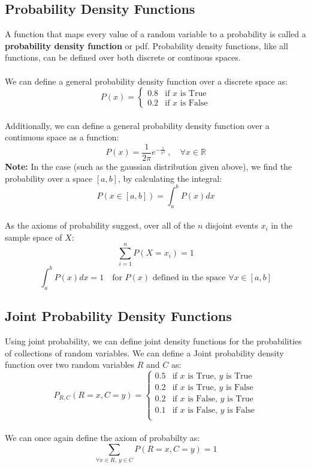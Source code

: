 \documentclass[12pt, a4paper]{book}
\begin{document}
\subsection{Probability Density Functions}
A function that maps every value of a random variable to a probability is called a \textbf{probability density function} or pdf. Probability density functions, like all functions, can be defined over both discrete or continous spaces.\\\\
We can define a general probability density function over a discrete space as:
$$P(x) = \begin{cases}
    0.8 & \text{if $x$ is True}\\
    0.2 & \text{if $x$ is False}
\end{cases}$$\\
Additionally, we can define a general probability density function over a continuous space as a function:
$$P(x) = \frac{1}{2\pi}e^{-\frac{1}{x^2}}\ , \quad \forall x \in \mathbb{R}$$
\textbf{Note:} In the case (such as the gaussian distribution given above), we find the probability over a space $[a,b]$, by calculating the integral:
$$P(x \in [a,b]) = \int^{b}_{a}P(x)dx$$\\
As the axioms of probability suggest, over all of the $n$ disjoint events $x_i$ in the sample space of $X$:
$$\sum^{n}_{i=1}P(X=x_i) = 1$$
$$\int^{b}_{a}P(x)dx = 1 \quad \text{for $P(x)$ defined in the space $\forall x \in [a,b]$}$$

\subsection{Joint Probability Density Functions}
Using joint probability, we can define joint density functions for the probabilities of collections of random variables. We can define a Joint probability density function over two random variables $R$ and $C$ as:
$$P_{R,C}(R=x,C=y) = \begin{cases}
    0.5 & \text{if $x$ is True, $y$ is True}\\
    0.2 & \text{if $x$ is True, $y$ is False}\\
    0.2 & \text{if $x$ is False, $y$ is True}\\
    0.1 & \text{if $x$ is False, $y$ is False}\\
\end{cases}$$\\
We can once again define the axiom of probabilty as:
$$\sum_{\forall x \in R,\ y \in C}P(R=x,C=y) = 1$$
\end{document}
